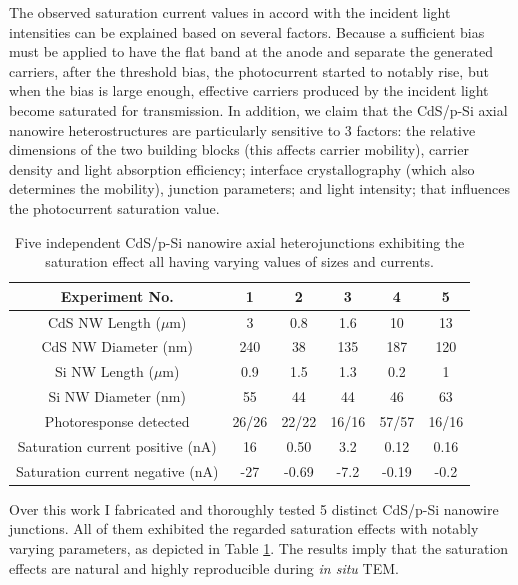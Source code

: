 The observed saturation current values in accord with the incident light intensities can be explained based on several factors. Because a sufficient bias must be applied to have the flat band at the anode and separate the generated carriers, after the threshold bias, the photocurrent started to notably rise, but when the bias is large enough, effective carriers produced by the incident light become saturated for transmission. In addition, we claim that the CdS/p-Si axial nanowire heterostructures are particularly sensitive to 3 factors: the relative dimensions of the two building blocks (this affects carrier mobility), carrier density and light absorption efficiency; interface crystallography (which also determines the mobility), junction parameters; and light intensity; that influences the photocurrent saturation value. 

\begin{table}[ht]
\centering
\begin{tabular}{|c|c|c|c|c|c|}
\hline
Experiment No. & 1 & 2 & 3 & 4 & 5\\
\hline
CdS NW Length ($\mu$m) & 3 & 0.8 & 1.6 & 10 & 13\\
CdS NW Diameter (nm) & 240 & 38 & 135 & 187 & 120\\
Si NW Length ($\mu$m) & 0.9 & 1.5 & 1.3 & 0.2 & 1\\
Si NW Diameter (nm) & 55 & 44 & 44 & 46 & 63\\
Photoresponse detected & 26/26 & 22/22 & 16/16 & 57/57 & 16/16\\
Saturation current positive (nA) & 16 & 0.50 & 3.2 & 0.12 & 0.16\\
Saturation current negative (nA) & -27 & -0.69 & -7.2 & -0.19 & -0.2\\
\hline
\end{tabular}
\caption[Reproducibility of the saturation effect]{Five independent CdS/p-Si nanowire axial heterojunctions exhibiting the saturation effect all having varying values of sizes and currents. 
\label{table:3_1}}
\end{table}

Over this work I fabricated and thoroughly tested 5 distinct CdS/p-Si nanowire junctions. All of them exhibited the regarded saturation effects with notably varying parameters, as depicted in Table \ref{table:3_1}. The results imply that the saturation effects are natural and highly reproducible during \emph{in situ} TEM. 

